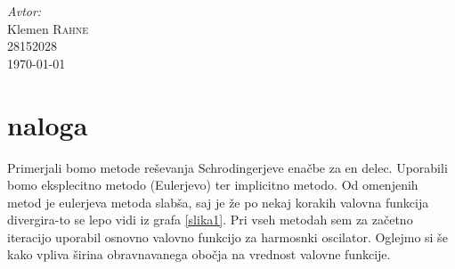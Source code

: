 \documentclass[slovene,11pt,a4paper]{article}
\numberwithin{equation}{section} %
\numberwithin{figure}{section} %
\numberwithin{table}{section} %
\begin{document}
\begin{titlepage}



\Large \emph{Avtor:}\\
Klemen \textsc{Rahne}\\
28152028\\[2cm]

{\large \today } \\[0.5cm] %

	

\end{titlepage}




\section{naloga}
Primerjali bomo metode reševanja Schrodingerjeve enačbe za en delec. Uporabili bomo eksplecitno metodo (Eulerjevo) ter implicitno metodo. Od omenjenih metod je eulerjeva metoda slabša, saj je že po nekaj korakih valovna funkcija divergira-to se lepo vidi iz grafa \ref{slika1}. Pri vseh metodah sem za začetno iteracijo uporabil osnovno valovno funkcijo za harmosnki oscilator. Oglejmo si še kako vpliva širina obravnavanega obočja na vrednost valovne funkcije.
\end{document}
